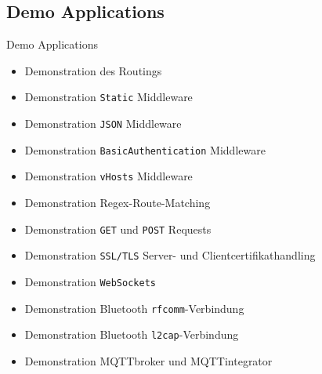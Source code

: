 ﻿\subsection{Demo Applications}

\begin{frame}{Demo Applications}
  \begin{itemize}
    \item Demonstration des Routings
    \item Demonstration \texttt{Static} Middleware
    \item Demonstration \texttt{JSON} Middleware
    \item Demonstration \texttt{BasicAuthentication} Middleware
    \item Demonstration \texttt{vHosts} Middleware
    \item Demonstration Regex-Route-Matching
    \item Demonstration \texttt{GET} und \texttt{POST} Requests
    \item Demonstration \texttt{SSL/TLS} Server- und Clientcertifikathandling
    \item Demonstration \texttt{WebSockets}
    \item Demonstration Bluetooth \texttt{rfcomm}-Verbindung
    \item Demonstration Bluetooth \texttt{l2cap}-Verbindung
    \item Demonstration MQTTbroker und MQTTintegrator
  \end{itemize}
\end{frame}
